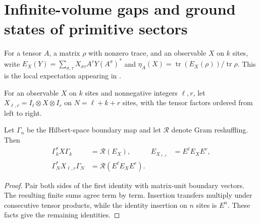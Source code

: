 \section{Infinite-volume gaps and ground states of primitive sectors}

\begin{definition}
    \label{def:primitive_insertion_expectation}
    \leanok
    For a tensor $A$, a matrix $\rho$ with nonzero trace, and an observable
    $X$ on $k$ sites, write
    $E_X(Y)=\sum_{\sigma,\tau}X_{\sigma\tau}A^\tau Y(A^\sigma)^*$ and
    $\eta_A(X)=\operatorname{tr}(E_X(\rho))/\operatorname{tr}\rho$.
    This is the local expectation appearing in
    \cite[Section~6]{Nachtergaele1996Spectral}.
\end{definition}

\begin{definition}
    \label{def:primitive_bulk_observable}
    \leanok
    For an observable $X$ on $k$ sites and nonnegative integers $\ell,r$,
    let $X_{\ell,r}=I_\ell\otimes X\otimes I_r$ on $N=\ell+k+r$ sites,
    with the tensor factors ordered from left to right.
\end{definition}

\begin{lemma}
    \label{thm:primitive_insertion_boundary_identity}
    \leanok
    Let $\Gamma_n$ be the Hilbert-space boundary map and let
    $\mathcal R$ denote Gram reshuffling. Then
    \begin{align}
        \Gamma_k^*X\Gamma_k          & =\mathcal R(E_X),           &
        E_{X_{\ell,r}}               & =E^\ell E_XE^r,               \\
        \Gamma_N^*X_{\ell,r}\Gamma_N & =\mathcal R(E^\ell E_XE^r).
    \end{align}
\end{lemma}
\begin{proof}\leanok
    Pair both sides of the first identity with matrix-unit boundary vectors.
    The resulting finite sums agree term by term.
    Insertion transfers multiply under consecutive tensor products,
    while the identity insertion on $n$ sites is $E^n$.
    These facts give the remaining identities.
\end{proof}

